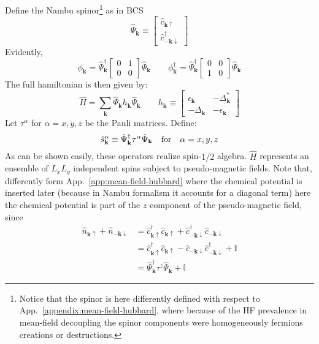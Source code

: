 Define the Nambu spinor\footnote{
	Notice that the spinor is here differently defined with respect to App.~\ref{appendix:mean-field-hubbard}, where because of the HF prevalence in mean-field decoupling the spinor components were homogeneously fermions creations or destructions.
} as in BCS
\[
	\hat \Psi_\mathbf{k} \equiv \begin{bmatrix}
		\hat c_{\mathbf{k}\uparrow} \\
		\hat c_{-\mathbf{k}\downarrow}^\dagger
	\end{bmatrix}
\]
Evidently,
\begin{equation}\label{eq:extended-hubbard-phi-psi-expressions}
	\phi_\mathbf{k} = \hat \Psi_\mathbf{k}^\dagger \begin{bmatrix}
		0 & 1 \\ 0 & 0
	\end{bmatrix} \hat \Psi_\mathbf{k}
	\qquad
	\phi_\mathbf{k}^\dagger = \hat \Psi_\mathbf{k}^\dagger \begin{bmatrix}
		0 & 0 \\ 1 & 0
	\end{bmatrix} \hat \Psi_\mathbf{k}
\end{equation}
The full hamiltonian is then given by:
\begin{equation}\label{eq:extended-hubbard-hamiltonian-nambu-bogoliubov}
	\hat H = \sum_\mathbf{k} \hat \Psi_\mathbf{k} h_\mathbf{k} \hat \Psi_\mathbf{k}
	\qquad
	h_\mathbf{k} \equiv \begin{bmatrix}
		\epsilon_\mathbf{k} & - \Delta_\mathbf{k}^* \\
		- \Delta_\mathbf{k} & - \epsilon_\mathbf{k}
	\end{bmatrix}
\end{equation}
Let $\tau^\alpha$ for $\alpha = x,y,z$ be the Pauli matrices. Define:
\[
	\hat s_\mathbf{k}^\alpha \equiv \hat \Psi_\mathbf{k}^\dagger \tau^\alpha \hat \Psi_\mathbf{k}
	\qq{for}
	\alpha = x,y,z
\]
As can be shown easily, these operators realize spin-$1/2$ algebra. $\hat H$ represents an ensemble of $L_x L_y$ independent spins subject to pseudo-magnetic fields. Note that, differently form App.~\ref{app:mean-field-hubbard} where the chemical potential is inserted later (because in Nambu formalism it accounts for a diagonal term) here the chemical potential is part of the $z$ component of the pseudo-magnetic field, since
\begin{align}
	\hat n_{\mathbf{k}\uparrow} + \hat n_{-\mathbf{k}\downarrow} &= \hat c_{\mathbf{k}\uparrow}^\dagger \hat c_{\mathbf{k}\uparrow} + \hat c_{-\mathbf{k}\downarrow}^\dagger \hat c_{-\mathbf{k}\downarrow} \nonumber \\
	&= \hat c_{\mathbf{k}\uparrow}^\dagger \hat c_{\mathbf{k}\uparrow} - \hat c_{-\mathbf{k}\downarrow} \hat c_{-\mathbf{k}\downarrow}^\dagger + \mathbb{I} \nonumber \\
	&=  \hat \Psi_\mathbf{k}^\dagger \tau^z \hat \Psi_\mathbf{k} + \mathbb{I} \label{eq:number-operator-z-spin-relation}
\end{align}
